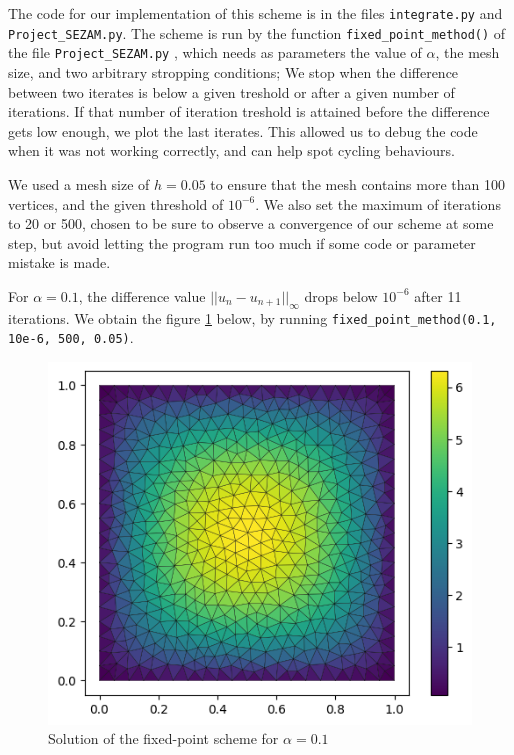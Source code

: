 \documentclass[11pt, a4paper, twoside]{article}
\begin{document}
The code for our implementation of this scheme is in the files \verb+integrate.py+ and \verb+Project_SEZAM.py+. The scheme is run by the function \verb+fixed_point_method()+ of the file  \verb+Project_SEZAM.py+ , which needs as parameters the value of $\alpha$, the mesh size, and two arbitrary stropping conditions; We stop when the difference between two iterates is below a given treshold or after a given number of iterations. If that number of iteration treshold is attained before the difference gets low enough, we plot the last iterates. This allowed us to debug the code when it was not working correctly, and can help spot cycling behaviours.

We used a mesh size of $h=0.05$ to ensure that the mesh contains more than 100 vertices, and the given threshold of $10^{-6}$. We also set the maximum of iterations to 20 or 500, chosen to be sure to observe a convergence of our scheme at some step, but avoid letting the program run too much if some code or parameter mistake is made.

For $\alpha=0.1$, the difference value $||u_n -u_{n+1}||_\infty$ drops below $10^{-6}$ after 11 iterations. We obtain the figure \ref{q2fig1} below, by running \verb+fixed_point_method(0.1, 10e-6, 500, 0.05)+.
\begin{figure}[H]
\centering
\includegraphics[scale = 0.7]{../Figures/fixed_sol_alpha0.1.png}
\caption{Solution of the fixed-point scheme for $\alpha=0.1$}
\label{q2fig1}
\end{figure}
\end{document}
